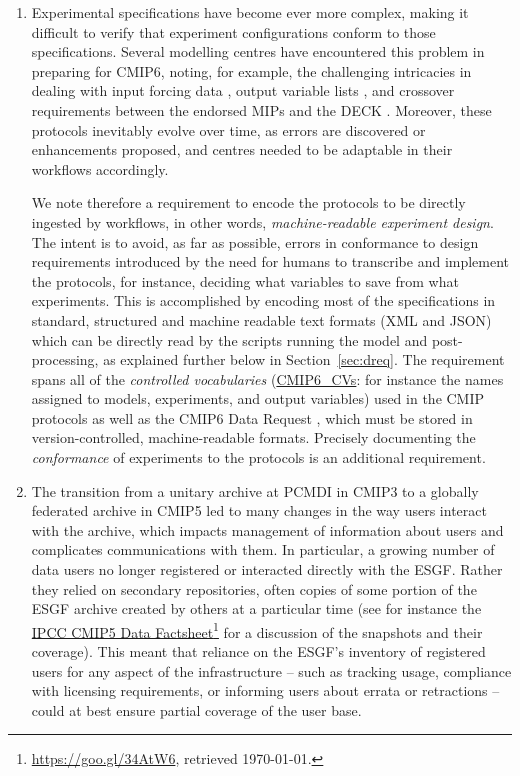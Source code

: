 \documentclass[gmd,manuscript]{copernicus}
\newcommand{\urlref}[2] {\href{#1}{#2}\footnote{\url{#1}, retrieved \today.}}
\begin{document}
\begin{enumerate}
\item\label{cmplx} Experimental specifications have become ever more
  complex, making it difficult to verify that experiment
  configurations conform to those specifications.
  Several modelling centres have encountered this problem in preparing
  for CMIP6, noting, for example, the challenging intricacies in
  dealing with input forcing data \citep[see][]{ref:duracketal2018},
  output variable lists \citep{ref:juckesetal2015}, and crossover
  requirements between the endorsed MIPs and the DECK
  \citep{ref:eyringetal2016a} . Moreover, these protocols inevitably
  evolve over time, as errors are discovered or enhancements proposed,
  and centres needed to be adaptable in their workflows accordingly.
   
  We note therefore a requirement to encode the protocols to be
  directly ingested by workflows, in other words,
  \emph{machine-readable experiment design}.
  The intent is to avoid, as far as possible, errors in conformance to
  design requirements introduced by the need for humans to transcribe
  and implement the protocols, for instance, deciding what variables
  to save from what experiments. This is accomplished by encoding most
  of the specifications in standard, structured and machine readable text
  formats (XML and JSON) which can be directly read by the scripts running the model
  and post-processing, as explained further below in Section~\ref{sec:dreq}.
  The requirement spans all of the \emph{controlled vocabularies} 
  (\hyperlink{https://github.com/WCRP-CMIP/CMIP6_CVs}{CMIP6\_CVs}:
  for instance the names assigned to models, experiments, and output
  variables) used in the CMIP protocols as well as the CMIP6 Data
  Request \citep{ref:juckesetal2015}, which must be stored in
  version-controlled, machine-readable formats. Precisely documenting
  the \emph{conformance} of experiments to the protocols
  \citep{ref:lawrenceetal2012} is an additional requirement.
  
\item\label{snap} The transition from a unitary archive at PCMDI in
  CMIP3 to a globally federated archive in CMIP5 led to many changes
  in the way users interact with the archive, which impacts management
  of information about users and complicates communications with them.
  In particular, a growing number of data users no longer registered or
  interacted directly with the ESGF. Rather they relied on secondary
  repositories, often copies of some portion of
  the ESGF archive created by others at a particular time (see for
  instance the \urlref{https://goo.gl/34AtW6}{IPCC CMIP5 Data
    Factsheet}
  for a discussion of the snapshots and their coverage). This meant
  that reliance on the ESGF's inventory of registered users for any
  aspect of the infrastructure -- such as tracking usage, compliance
  with licensing requirements, or informing users about errata or
  retractions -- could at best ensure partial coverage of the user
  base.


\end{enumerate}
\end{document}
